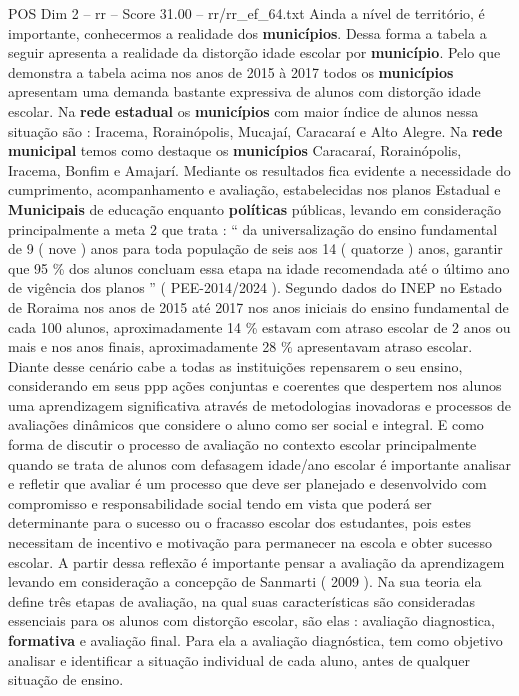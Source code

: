 \begin{textsample}{POS Dim 2 – rr – Score 31.00 – rr/rr\_ef\_64.txt}
Ainda a nível de território, é importante, conhecermos a realidade dos \textbf{municípios}.
Dessa forma a tabela a seguir apresenta a realidade da distorção idade escolar por \textbf{município}.
Pelo que demonstra a tabela acima nos anos de 2015 à 2017 todos os \textbf{municípios} apresentam uma demanda bastante expressiva de alunos com distorção idade escolar.
Na \textbf{rede} \textbf{estadual} os \textbf{municípios} com maior índice de alunos nessa situação são : Iracema, Rorainópolis, Mucajaí, Caracaraí e Alto Alegre.
Na \textbf{rede} \textbf{municipal} temos como destaque os \textbf{municípios} Caracaraí, Rorainópolis, Iracema, Bonfim e Amajarí.
Mediante os resultados fica evidente a necessidade do cumprimento, acompanhamento e avaliação, estabelecidas nos planos Estadual e \textbf{Municipais} de educação enquanto \textbf{políticas} públicas, levando em consideração principalmente a meta 2 que trata : “ da universalização do ensino fundamental de 9 ( nove ) anos para toda população de seis aos 14 ( quatorze ) anos, garantir que 95 \% dos alunos concluam essa etapa na idade recomendada até o último ano de vigência dos planos ” ( PEE-2014/2024 ).
Segundo dados do INEP no Estado de Roraima nos anos de 2015 até 2017 nos anos iniciais do ensino fundamental de cada 100 alunos, aproximadamente 14 \% estavam com atraso escolar de 2 anos ou mais e nos anos finais, aproximadamente 28 \% apresentavam atraso escolar.
Diante desse cenário cabe a todas as instituições repensarem o seu ensino, considerando em seus ppp ações conjuntas e coerentes que despertem nos alunos uma aprendizagem significativa através de metodologias inovadoras e processos de avaliações dinâmicos que considere o aluno como ser social e integral.
E como forma de discutir o processo de avaliação no contexto escolar principalmente quando se trata de alunos com defasagem idade/ano escolar é importante analisar e refletir que avaliar é um processo que deve ser planejado e desenvolvido com compromisso e responsabilidade social tendo em vista que poderá ser determinante para o sucesso ou o fracasso escolar dos estudantes, pois estes necessitam de incentivo e motivação para permanecer na escola e obter sucesso escolar.
A partir dessa reflexão é importante pensar a avaliação da aprendizagem levando em consideração a concepção de Sanmarti ( 2009 ).
Na sua teoria ela define três etapas de avaliação, na qual suas características são consideradas essenciais para os alunos com distorção escolar, são elas : avaliação diagnostica, \textbf{formativa} e avaliação final.
Para ela a avaliação diagnóstica, tem como objetivo analisar e identificar a situação individual de cada aluno, antes de qualquer situação de ensino.

\end{textsample}
